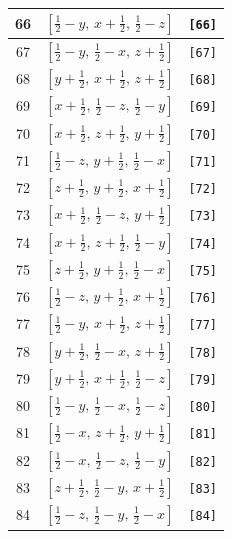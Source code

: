 \documentclass[fleqn,8pt]{jsarticle}
\begin{document}
\begin{longtable}{ccc}
66 & $\left[ \frac{1}{2} - y,\, x + \frac{1}{2},\, \frac{1}{2} - z \right]$ & {\tt [66]} \\ \hline
67 & $\left[ \frac{1}{2} - y,\, \frac{1}{2} - x,\, z + \frac{1}{2} \right]$ & {\tt [67]} \\ \hline
68 & $\left[ y + \frac{1}{2},\, x + \frac{1}{2},\, z + \frac{1}{2} \right]$ & {\tt [68]} \\ \hline
69 & $\left[ x + \frac{1}{2},\, \frac{1}{2} - z,\, \frac{1}{2} - y \right]$ & {\tt [69]} \\ \hline
70 & $\left[ x + \frac{1}{2},\, z + \frac{1}{2},\, y + \frac{1}{2} \right]$ & {\tt [70]} \\ \hline
71 & $\left[ \frac{1}{2} - z,\, y + \frac{1}{2},\, \frac{1}{2} - x \right]$ & {\tt [71]} \\ \hline
72 & $\left[ z + \frac{1}{2},\, y + \frac{1}{2},\, x + \frac{1}{2} \right]$ & {\tt [72]} \\ \hline
73 & $\left[ x + \frac{1}{2},\, \frac{1}{2} - z,\, y + \frac{1}{2} \right]$ & {\tt [73]} \\ \hline
74 & $\left[ x + \frac{1}{2},\, z + \frac{1}{2},\, \frac{1}{2} - y \right]$ & {\tt [74]} \\ \hline
75 & $\left[ z + \frac{1}{2},\, y + \frac{1}{2},\, \frac{1}{2} - x \right]$ & {\tt [75]} \\ \hline
76 & $\left[ \frac{1}{2} - z,\, y + \frac{1}{2},\, x + \frac{1}{2} \right]$ & {\tt [76]} \\ \hline
77 & $\left[ \frac{1}{2} - y,\, x + \frac{1}{2},\, z + \frac{1}{2} \right]$ & {\tt [77]} \\ \hline
78 & $\left[ y + \frac{1}{2},\, \frac{1}{2} - x,\, z + \frac{1}{2} \right]$ & {\tt [78]} \\ \hline
79 & $\left[ y + \frac{1}{2},\, x + \frac{1}{2},\, \frac{1}{2} - z \right]$ & {\tt [79]} \\ \hline
80 & $\left[ \frac{1}{2} - y,\, \frac{1}{2} - x,\, \frac{1}{2} - z \right]$ & {\tt [80]} \\ \hline
81 & $\left[ \frac{1}{2} - x,\, z + \frac{1}{2},\, y + \frac{1}{2} \right]$ & {\tt [81]} \\ \hline
82 & $\left[ \frac{1}{2} - x,\, \frac{1}{2} - z,\, \frac{1}{2} - y \right]$ & {\tt [82]} \\ \hline
83 & $\left[ z + \frac{1}{2},\, \frac{1}{2} - y,\, x + \frac{1}{2} \right]$ & {\tt [83]} \\ \hline
84 & $\left[ \frac{1}{2} - z,\, \frac{1}{2} - y,\, \frac{1}{2} - x \right]$ & {\tt [84]} \\ \hline

\end{longtable}
\end{document}
